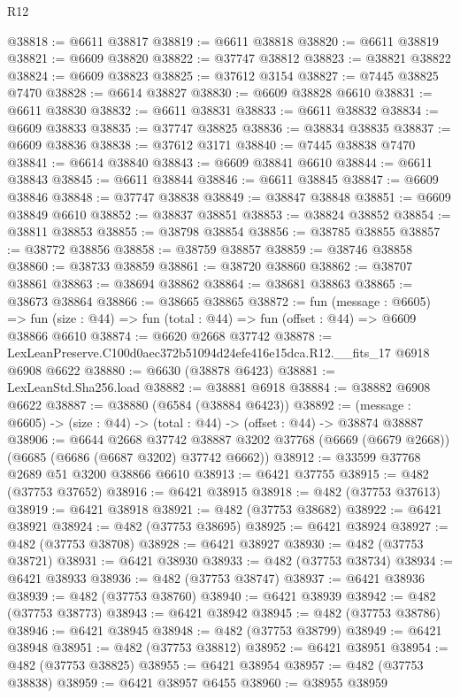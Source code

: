 \begin{lexlean}{R12}
\begin{coremodule}
@38818 := @6611 @38817
@38819 := @6611 @38818
@38820 := @6611 @38819
@38821 := @6609 @38820
@38822 := @37747 @38812
@38823 := @38821 @38822
@38824 := @6609 @38823
@38825 := @37612 @3154
@38827 := @7445 @38825 @7470
@38828 := @6614 @38827
@38830 := @6609 @38828 @6610
@38831 := @6611 @38830
@38832 := @6611 @38831
@38833 := @6611 @38832
@38834 := @6609 @38833
@38835 := @37747 @38825
@38836 := @38834 @38835
@38837 := @6609 @38836
@38838 := @37612 @3171
@38840 := @7445 @38838 @7470
@38841 := @6614 @38840
@38843 := @6609 @38841 @6610
@38844 := @6611 @38843
@38845 := @6611 @38844
@38846 := @6611 @38845
@38847 := @6609 @38846
@38848 := @37747 @38838
@38849 := @38847 @38848
@38851 := @6609 @38849 @6610
@38852 := @38837 @38851
@38853 := @38824 @38852
@38854 := @38811 @38853
@38855 := @38798 @38854
@38856 := @38785 @38855
@38857 := @38772 @38856
@38858 := @38759 @38857
@38859 := @38746 @38858
@38860 := @38733 @38859
@38861 := @38720 @38860
@38862 := @38707 @38861
@38863 := @38694 @38862
@38864 := @38681 @38863
@38865 := @38673 @38864
@38866 := @38665 @38865
@38872 := fun (message : @6605) =>
  fun (size : @44) => fun (total : @44) => fun (offset : @44) => @6609 @38866 @6610
@38874 := @6620 @2668 @37742
@38878 := LexLeanPreserve.C100d0aec372b51094d24efe416e15dca.R12.__fits_17 @6918 @6908 @6622
@38880 := @6630 (@38878 @6423)
@38881 := LexLeanStd.Sha256.load
@38882 := @38881 @6918
@38884 := @38882 @6908 @6622
@38887 := @38880 (@6584 (@38884 @6423))
@38892 := (message : @6605) -> (size : @44) -> (total : @44) -> (offset : @44) -> @38874 @38887
@38906 := @6644
    @2668
    @37742
    @38887
    @3202
    @37768
    (@6669 (@6679 @2668))
    (@6685 (@6686 (@6687 @3202) @37742 @6662))
@38912 := @33599 @37768 @2689 @51 @3200 @38866 @6610
@38913 := @6421 @37755
@38915 := @482 (@37753 @37652)
@38916 := @6421 @38915
@38918 := @482 (@37753 @37613)
@38919 := @6421 @38918
@38921 := @482 (@37753 @38682)
@38922 := @6421 @38921
@38924 := @482 (@37753 @38695)
@38925 := @6421 @38924
@38927 := @482 (@37753 @38708)
@38928 := @6421 @38927
@38930 := @482 (@37753 @38721)
@38931 := @6421 @38930
@38933 := @482 (@37753 @38734)
@38934 := @6421 @38933
@38936 := @482 (@37753 @38747)
@38937 := @6421 @38936
@38939 := @482 (@37753 @38760)
@38940 := @6421 @38939
@38942 := @482 (@37753 @38773)
@38943 := @6421 @38942
@38945 := @482 (@37753 @38786)
@38946 := @6421 @38945
@38948 := @482 (@37753 @38799)
@38949 := @6421 @38948
@38951 := @482 (@37753 @38812)
@38952 := @6421 @38951
@38954 := @482 (@37753 @38825)
@38955 := @6421 @38954
@38957 := @482 (@37753 @38838)
@38959 := @6421 @38957 @6455
@38960 := @38955 @38959

\end{coremodule}
\end{lexlean}
